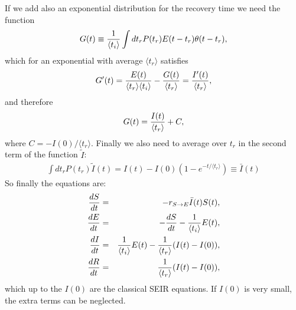 \documentclass[a4paper,oneside,11pt]{article}
\begin{document}
If we add also an exponential distribution for the recovery time we need the function
\begin{eqnarray}
G(t) \equiv {1\over \langle t_i\rangle } \int dt_r P(t_r) E(t-t_r) \theta(t-t_r), 
\end{eqnarray}
which for an exponential with average $\langle t_r\rangle$ satisfies
\begin{eqnarray}
G'(t) = {E(t)\over \langle t_r\rangle \langle t_i\rangle} - {G(t)\over  \langle t_r\rangle} = {I'(t)\over \langle t_r \rangle},
\end{eqnarray}
and therefore 
\begin{eqnarray}
G(t) = {I(t)\over \langle t_r \rangle} + C,
\end{eqnarray}
where $C= -I(0)/\langle t_r \rangle$.
Finally we also need to average over $t_r$ in the second term of the function $\tilde{I}$:
\begin{eqnarray}
\int d t_r P(t_r) \tilde{I}(t) = I(t) - I(0) \left(1- e^{-t/\langle t_r\rangle}  \right) \equiv \bar{I}(t)
\end{eqnarray}
 So finally the equations are:
\begin{eqnarray}
{d S\over dt} &=& - r_{S\rightarrow E} \bar{I}(t) S(t),\nonumber\\ 
{d E\over dt} &=& -{d S\over d t} -{1 \over \langle t_i\rangle} E(t) ,\nonumber\\
{d I\over dt} &=& {1 \over \langle t_i\rangle} E(t) - {1\over  \langle t_r \rangle} (I(t) -I(0)),\nonumber\\
{d R\over d t} &=&  {1\over  \langle t_r\rangle} (I(t)-I(0)),\nonumber\\
\label{eqs:seirexp}
\end{eqnarray}
which up to the $I(0)$ are the classical SEIR equations. If $I(0)$ is very small, the extra terms 
 can  be neglected. 
\end{document}
